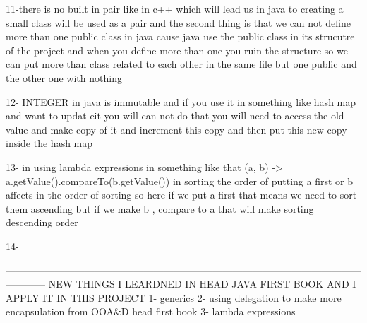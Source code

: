 11-there is no built in pair like in c++ which will lead us in java to creating a small class will be used as a pair 
and the second thing is that we can not define more than one public class in java cause java use the public class in its strucutre of the project 
and when you define more than one you ruin the structure so we can put more than class related to each other in the same file but one public and the other one with nothing

12- INTEGER in java is immutable and if you use it in something like hash map and want to updat eit you will can not do that 
you will need to access the old value and make copy of it and increment this copy and then put this new copy inside the hash map

13- in using lambda expressions in something like that (a, b) -> a.getValue().compareTo(b.getValue()) in sorting the order of putting
a first or b affects in the order of sorting so here if we put a first that means we need to sort them ascending 
but if we make b , compare to a that will make sorting descending order 

14-






























------------------------------------------------------------------------------------------------------------------------
                                          NEW THINGS I LEARDNED IN HEAD JAVA FIRST BOOK AND I APPLY IT IN THIS PROJECT
1- generics
2- using delegation to make more encapsulation from OOA&D head first book 
3- lambda expressions 
